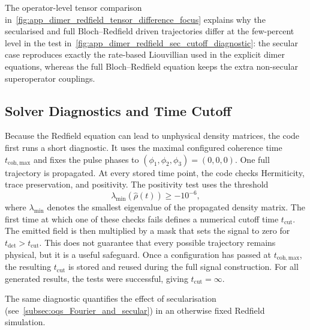 The operator-level tensor comparison
in~\autoref{fig:app_dimer_redfield_tensor_difference_focus} explains why the
secularised and full Bloch--Redfield driven trajectories differ at the
few-percent level in the test
in~\autoref{fig:app_dimer_redfield_sec_cutoff_diagnostic}: the secular case
reproduces exactly the rate-based Liouvillian used in the explicit dimer
equations, whereas the full Bloch--Redfield equation keeps the extra
non-secular superoperator couplings.


\subsection{Solver Diagnostics and Time Cutoff}

Because the Redfield equation can lead to unphysical density matrices, the code first runs a short diagnostic. It uses the maximal configured coherence time \(t_{\mathrm{coh,max}}\) and fixes the pulse phases to \((\phi_1,\phi_2,\phi_3)=(0,0,0)\). One full trajectory is propagated. At every stored time point, the code checks Hermiticity, trace preservation, and positivity. The positivity test uses the threshold
\begin{equation*}
\lambda_{\min}(\hat{\rho}(t)) \ge -10^{-6},
\end{equation*}
where \(\lambda_{\min}\) denotes the smallest eigenvalue of the propagated density matrix. The first time at which one of these checks fails defines a numerical cutoff time \(t_{\mathrm{cut}}\). The emitted field is then multiplied by a mask that sets the signal to zero for \(t_{\mathrm{det}} > t_{\mathrm{cut}}\). This does not guarantee that every possible trajectory remains physical, but it is a useful safeguard.
Once a configuration has passed at \(t_{\mathrm{coh,max}}\), the resulting \(t_{\mathrm{cut}}\) is stored and reused during the full signal construction. For all generated results, the tests were successful, giving \(t_{\mathrm{cut}}=\infty\).

The same diagnostic quantifies the effect of secularisation
(see~\autoref{subsec:oqs_Fourier_and_secular}) in an otherwise fixed Redfield
simulation.

